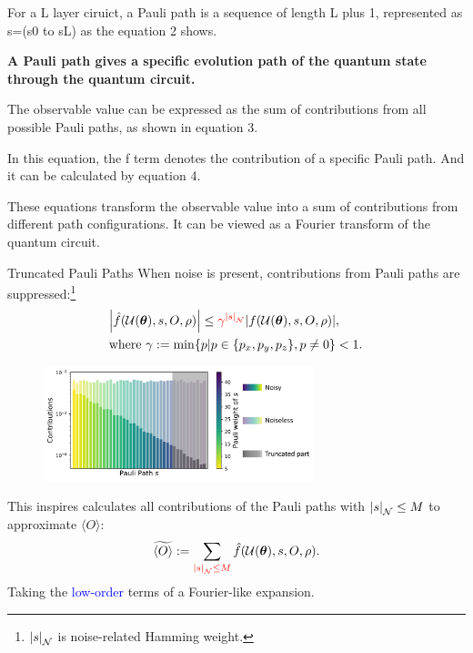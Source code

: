 \documentclass[10pt]{beamer}
\begin{document}
\begin{CJK}{UTF8}{gbsn}
{ For a L layer ciruict, a Pauli path is a sequence of length L plus 1, represented as s=(s0 to sL) as the equation 2 shows.
 

 \textbf{A Pauli path gives a specific evolution path of the quantum state through the quantum circuit.}

 The observable value can be expressed as the sum of contributions from all possible Pauli paths, as shown in equation 3.

 In this equation, the f term denotes the contribution of a specific Pauli path. And it can be calculated by equation 4.

 These equations transform the observable value into a sum of contributions from different path configurations. It can be viewed as a Fourier transform of the quantum circuit.
 }




\begin{frame}[fragile]{Truncated Pauli Paths}
  \vspace{-0.5em}
  When noise is present, contributions from Pauli paths are suppressed:\footnote{$\abs{s}_\mathcal{N}$ is noise-related Hamming weight.}
  \begin{equation}
  \begin{aligned}
      &\abs{\hat{f}(\mathcal{U}(\bm{\theta}),s,O,\rho)}\leq \textcolor{red}{\gamma^{\abs{s}_\mathcal{N}}} \abs{f(\mathcal{U}(\bm{\theta}),s,O,\rho)},\\
      &\text{where }  \gamma:=\min\{p|{p \in \{p_x,p_y,p_z\},p\neq 0}\} <1.
    \end{aligned}   
\end{equation}
    \vspace{-1em}
  \begin{figure}
    \centering
    \includegraphics[width=0.7\textwidth]{fig/first.pdf}
  \end{figure}
  \vspace{-1em}
 This inspires calculates all contributions of the Pauli paths with $\abs{s}_\mathcal{N}\leq M$ to approximate ${\langle O \rangle}$:%
  \begin{equation}
 \widetilde{\langle O \rangle}:=\sum_{\textcolor{red}{\abs{s}_\mathcal{N}\leq M}} \hat{f}(\mathcal{U}(\bm{\theta}),s,O,\rho).
  \end{equation}
  Taking the \textcolor{blue}{low-order} terms of a Fourier-like expansion.
  \vspace{0.5em}
\end{frame}
\end{CJK}
\end{document}

